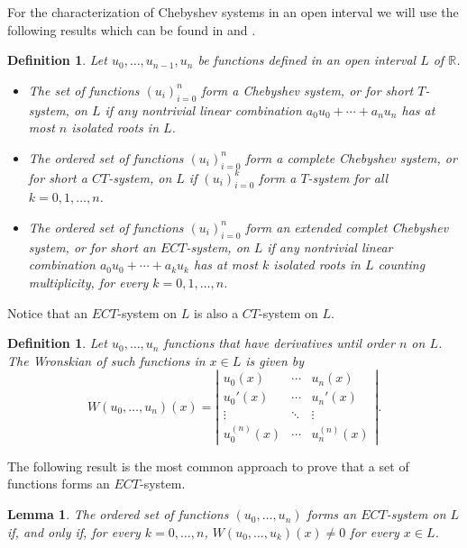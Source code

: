 \documentclass[12pt,a4paper,reqno]{amsart}
\newtheorem{lema}[teo]{Lemma}
\newtheorem{defi}[teo]{Definition}
\newcommand{\re}{\mathbb{R}}
\begin{document}
     For the
    characterization of Chebyshev systems in an open interval we will use the following results which can be
     found in \cite{KarStu1966} and \cite{Mardesic1998}.

    \begin{defi}
        Let $ u_0,\ldots, u_ {n-1}, u_n $ be functions defined in an open interval $ L $ of $ \re $.
        \begin{itemize}
            \item [(a)] The set of functions $( u_i)_{i=0}^n$ form a  Chebyshev system, or for short  $T$-system, on $L$ if any
             nontrivial linear combination $a_0u_0 +\cdots+ a_n u_n$ has at most $ n $ isolated roots in $ L $.

            \item [(b)] The ordered set of functions $( u_i)_{i=0}^n$ form a complete Chebyshev system, or for short a  $CT$-system, on
             $L$ if $( u_i)_{i=0}^k$ form a $T$-system for all $k=0,1,\ldots,n$.

            \item[(c)]   The ordered set of functions $ (u_i ) _ {i = 0} ^ n $ form an extended complet Chebyshev system, or
            for short an $ ECT $-system, on $ L $ if any nontrivial linear combination $
a_0u_0 + \cdots+ a_k u_k $
            has at most $ k $ isolated roots in $ L $ counting multiplicity, for every $ k = 0,1,\ldots, n $.
        \end{itemize}
    \end{defi}

    Notice that  an  $ECT$-system on $L$ is also a  $CT$-system on $L$.
    \begin{defi}
        Let $u_0,\ldots,u_n$ functions that have derivatives until order $n$ on $L$.  The Wronskian of such functions in $x\in L$ is given by
        $$W(u_0,\ldots,u_n)(x) =  \left| \begin{array}{ccc}
        u_0(x) & \cdots & u_n(x) \\
        u_0'(x) &  \cdots & u_n'(x) \\
        \vdots &  \ddots & \vdots \\
        u_0^{(n)}(x)  & \cdots & u_n^{(n)}(x)
        \end{array} \right|.$$
    \end{defi}
The following result is the most common approach to prove that a set
of functions forms an $ECT$-system.
    \begin{lema}\label{lemasistemaTintervaloaberto}
        The ordered set of functions $(u_0, \ldots, u_n)$ forms an $ ECT $-system on $ L $
        if, and only if, for every $ k = 0, \ldots, n $, $ W (u_0, \ldots, u_k) (x) \neq 0 $ for every $ x \in L $.
    \end{lema}
\end{document}
